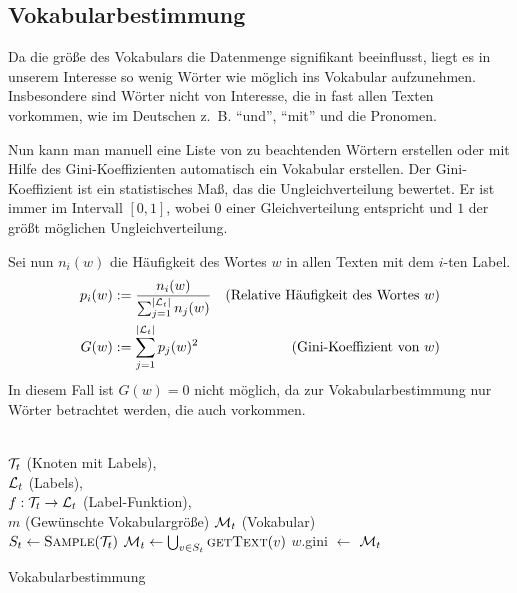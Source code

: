 \subsection{Vokabularbestimmung}\label{sec:vokabularbestimmung}
Da die größe des Vokabulars die Datenmenge signifikant beeinflusst,
liegt es in unserem Interesse so wenig Wörter wie möglich ins
Vokabular aufzunehmen. Insbesondere sind Wörter nicht von Interesse,
die in fast allen Texten vorkommen, wie im Deutschen z.~B.
\enquote{und}, \enquote{mit} und die Pronomen.

Nun kann man manuell eine Liste von zu beachtenden Wörtern erstellen
oder mit Hilfe des Gini-Koeffizienten automatisch ein Vokabular erstellen.
Der Gini-Koeffizient ist ein statistisches Maß, das die Ungleichverteilung
bewertet. Er ist immer im Intervall $[0,1]$, wobei $0$ einer 
Gleichverteilung entspricht und $1$ der größt möglichen Ungleichverteilung.

Sei nun $n_i(w)$ die Häufigkeit des Wortes $w$ in allen Texten mit 
dem $i$-ten Label.
\begin{align}
    p_i(w) &:= \frac{n_i(w)}{\sum_{j=1}^{|\mathcal{L}_t|} n_j(w)} &\text{(Relative Häufigkeit des Wortes $w$)}\\
    G(w)   &:= \sum_{j=1}^{|\mathcal{L}_t|} p_j(w)^2              &\text{(Gini-Koeffizient von $w$)}
\end{align}
In diesem Fall ist $G(w)=0$ nicht möglich, da zur Vokabularbestimmung
nur Wörter betrachtet werden, die auch vorkommen.

\begin{algorithm}[h]
    \begin{algorithmic}
        \Require \\
                 $\mathcal{T}_t$ (Knoten mit Labels),\\
                 $\mathcal{L}_t$ (Labels),\\
                 $f:\mathcal{T}_t \rightarrow \mathcal{L}_t$ (Label-Funktion),\\
                 $m$ (Gewünschte Vokabulargröße)
        \Ensure  $\mathcal{M}_t$ (Vokabular)\\

        \State $S_t \gets \Call{Sample}{\T_t}$ 
        \State $\M_t \gets \bigcup_{v \in S_t} \Call{getText}{v}$
            \State $w$.gini $\gets$ 
        \EndFor
        \State \Return $\mathcal{M}_t$
    \end{algorithmic}
\caption{Vokabularbestimmung}
\label{alg:vokabularbestimmung}
\end{algorithm}
